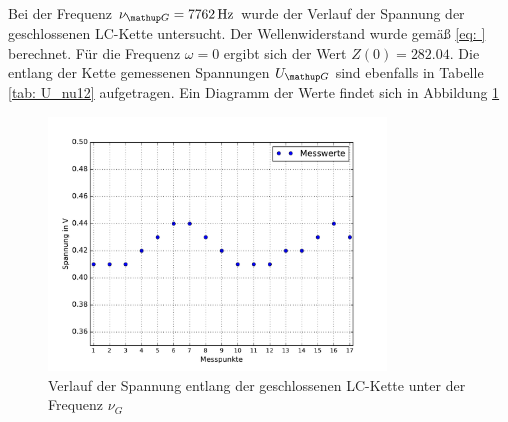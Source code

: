 Bei der Frequenz $\nu\ua{G} = \SI{7762}{\hertz}$ wurde der Verlauf der Spannung der geschlossenen LC-Kette untersucht. Der Wellenwiderstand
wurde gemäß \eqref{eq: } berechnet. Für die Frequenz $\omega = 0$ ergibt sich der Wert $Z(0) = 282.04$. Die entlang der Kette gemessenen
Spannungen $U\ua{G}$ sind ebenfalls in Tabelle \ref{tab: U_nu12} aufgetragen. Ein Diagramm der Werte findet sich in Abbildung \ref{fig: U_G}
\begin{figure}
  \centering
  \includegraphics[width = 0.8\textwidth]{../Messdaten/plots/spannungsverlauf_geschlossen.pdf}
  \caption{Verlauf der Spannung entlang der geschlossenen LC-Kette unter der Frequenz $\nu_G$}
  \label{fig: U_G}
\end{figure}
